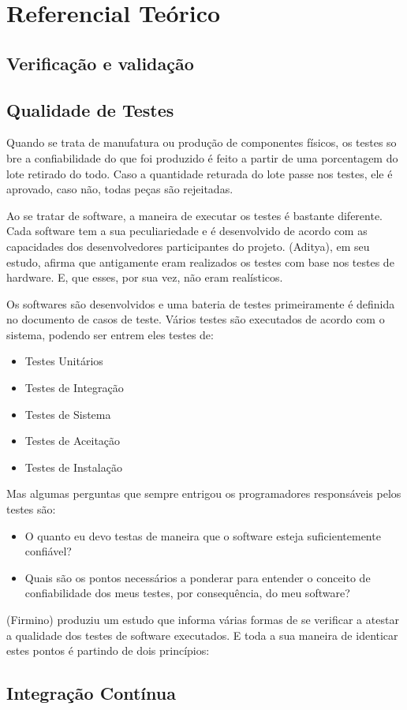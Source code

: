 \chapter[Referencial]{Referencial Teórico}

\section{Verificação e validação}
\section{Qualidade de Testes}
Quando se trata de manufatura ou produção de componentes físicos, os testes so
bre a confiabilidade do que foi produzido é feito a partir de uma porcentagem
do lote retirado do todo. Caso a quantidade returada do lote passe nos testes,
ele é aprovado, caso não, todas peças são rejeitadas.

Ao se tratar de software, a maneira de executar os testes é bastante diferente.
Cada software tem a sua peculiariedade e é desenvolvido de acordo com as
capacidades dos desenvolvedores participantes do projeto. (Aditya), em seu estudo,
afirma que antigamente eram realizados os testes com base nos testes de hardware.
E, que esses, por sua vez, não eram realísticos.

Os softwares são desenvolvidos e uma bateria de testes primeiramente é definida no
documento de casos de teste. Vários testes são  executados de acordo com o sistema,
podendo ser entrem eles testes de:

\begin{itemize}
\item Testes Unitários
\item Testes de Integração
\item Testes de Sistema
\item Testes de Aceitação
\item Testes de Instalação
\end{itemize}

Mas algumas perguntas que sempre entrigou os programadores responsáveis pelos testes são:

\begin{itemize}
\item O quanto eu devo testas de maneira que o software esteja suficientemente
confiável?
\item Quais são os pontos necessários a ponderar para entender o conceito
de confiabilidade dos meus testes, por consequência, do meu software?
\end{itemize}

(Firmino) produziu um estudo que informa várias formas de se verificar a atestar
a qualidade dos testes de software executados. E toda a sua maneira de identicar
estes pontos é partindo de dois princípios:

\section{Integração Contínua}


